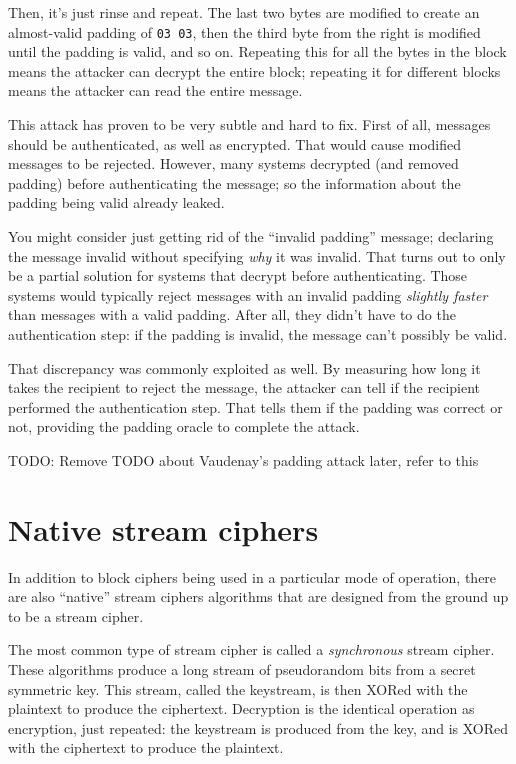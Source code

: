 \documentclass[11pt,ebook,table,dvipsnames]{memoir}
\begin{document}
Then, it's just rinse and repeat. The last two bytes are modified to
create an almost-valid padding of \verb|03 03|, then the third byte
from the right is modified until the padding is valid, and so on.
Repeating this for all the bytes in the block means the attacker can
decrypt the entire block; repeating it for different blocks means the
attacker can read the entire message.

This attack has proven to be very subtle and hard to fix. First of
all, messages should be authenticated, as well as encrypted. That
would cause modified messages to be rejected. However, many systems
decrypted (and removed padding) before authenticating the message; so
the information about the padding being valid already leaked.

You might consider just getting rid of the \enquote{invalid padding} message;
declaring the message invalid without specifying \emph{why} it was invalid.
That turns out to only be a partial solution for systems that decrypt
before authenticating. Those systems would typically reject messages
with an invalid padding \emph{slightly faster} than messages with a valid
padding. After all, they didn't have to do the authentication step: if
the padding is invalid, the message can't possibly be valid.

That discrepancy was commonly exploited as well. By measuring how long
it takes the recipient to reject the message, the attacker can tell if
the recipient performed the authentication step. That tells them if
the padding was correct or not, providing the padding oracle to
complete the attack.

TODO: Remove TODO about Vaudenay's padding attack later, refer to this
\section{Native stream ciphers}
\label{sec-2-3-10}

In addition to block ciphers being used in a particular mode of
operation, there are also \enquote{native} \glspl{stream cipher} algorithms
that are designed from the ground up to be a stream cipher.

The most common type of stream cipher is called a \emph{synchronous} stream
cipher. These algorithms produce a long stream of pseudorandom bits
from a secret symmetric key. This stream, called the keystream, is
then XORed with the plaintext to produce the ciphertext. Decryption is
the identical operation as encryption, just repeated: the keystream is
produced from the key, and is XORed with the ciphertext to produce the
plaintext.
\end{document}
